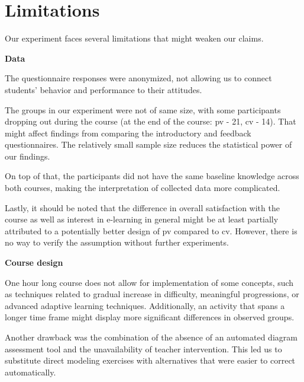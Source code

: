 \section{Limitations}

Our experiment faces several limitations that might weaken our claims. 

\textbf{Data}

The questionnaire responses were anonymized, not allowing us to connect students' behavior and performance to their attitudes. 

The groups in our experiment were not of same size, with some participants dropping out during the course (at the end of the course: \ac{pv} - 21, \ac{cv} - 14). That might affect findings from comparing the introductory and feedback questionnaires. The relatively small sample size reduces the statistical power of our findings.

On top of that, the participants did not have the same baseline knowledge across both courses, making the interpretation of collected data more complicated.

Lastly, it should be noted that the difference in overall satisfaction with the course as well as interest in e-learning in general might be at least partially attributed to a potentially better design of \ac{pv} compared to \ac{cv}. However, there is no way to verify the assumption without further experiments.


\textbf{Course design}

One hour long course does not allow for implementation of some concepts, such as techniques related to gradual increase in difficulty, meaningful progressions, or advanced adaptive learning techniques. Additionally, an activity that spans a longer time frame might display more significant differences in observed groups.

Another drawback was the combination of the absence of an automated diagram assessment tool and the unavailability of teacher intervention. This led us to substitute direct modeling exercises with alternatives that were easier to correct automatically.


